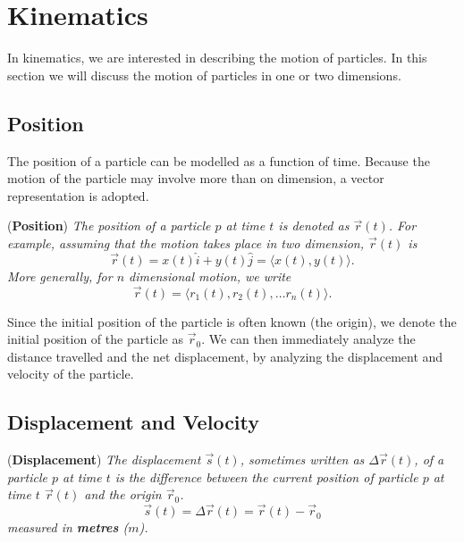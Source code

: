 \section{Kinematics}

In kinematics, we are interested in describing the motion of particles. In this section we will discuss the motion of particles in one or two dimensions. 

\subsection{Position}

The position of a particle can be modelled as a function of time. Because the motion of the particle may involve more than on dimension, a vector representation is adopted. 

\begin{definition}{(\textbf{Position})}
\textit{The position of a particle $p$ at time $t$ is denoted as $\vec{r}(t)$. For example, assuming that the motion takes place in two dimension, $\vec{r}(t)$ is}
\begin{equation*}
    \vec{r}(t) = x(t) \hat{i} + y(t) \hat{j} = \langle x(t), y(t) \rangle.
\end{equation*}
\textit{More generally, for $n$ dimensional motion, we write}
\begin{equation}
    \vec{r}(t) = \langle r_1 (t), r_2 (t), \ldots r_n (t) \rangle.
\end{equation}
\end{definition}

Since the initial position of the particle is often known (the origin), we denote the initial position of the particle as $\vec{r}_0$. We can then immediately analyze the distance travelled and the net displacement, by analyzing the displacement and velocity of the particle.

\subsection{Displacement and Velocity}

\begin{definition}{(\textbf{Displacement})}
\textit{The displacement $\vec{s}(t)$, sometimes written as $\Delta \vec{r}(t)$, of a particle $p$ at time $t$ is the difference between the current position of particle $p$ at time $t$ $\vec{r}(t)$ and the origin $\vec{r}_0$. }
\begin{equation}
    \vec{s}(t) = \Delta \vec{r}(t) = \vec{r}(t) - \vec{r}_0
\end{equation}
\textit{measured in \textbf{metres} ($m$).}
\end{definition}

